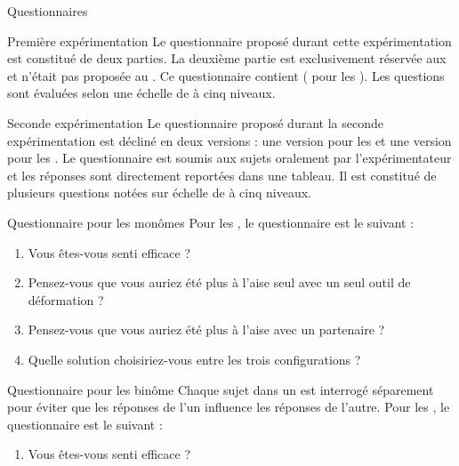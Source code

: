 \documentclass[myfrancais,ngerman,english,french]{mythesis}
\begin{document}
	\begin{mychapter}{Questionnaires}
		\begin{mysection}{Première expérimentation}
			Le questionnaire proposé durant cette expérimentation est constitué de deux parties.
			La deuxième partie est exclusivement réservée aux  et n'était pas proposée au .
			Ce questionnaire contient  ( pour les ).
			Les questions sont évaluées selon une échelle de  à cinq niveaux.
		\end{mysection}
		\begin{mysection}{Seconde expérimentation}
			Le questionnaire proposé durant la seconde expérimentation est décliné en deux versions : une version pour les  et une version pour les .
			Le questionnaire est soumis aux sujets oralement par l'expérimentateur et les réponses sont directement reportées dans une tableau.
			Il est constitué de plusieurs questions notées sur échelle de  à cinq niveaux.
			\begin{mysubsection}{Questionnaire pour les monômes}
				Pour les , le questionnaire est le suivant :
				\begin{enumerate}
					\item Vous êtes-vous senti efficace ?
					\item Pensez-vous que vous auriez été plus à l'aise seul avec un seul outil de déformation ?
					\item Pensez-vous que vous auriez été plus à l'aise avec un partenaire ?
					\item Quelle solution choisiriez-vous entre les trois configurations ?
				\end{enumerate}
			\end{mysubsection}
			\begin{mysubsection}{Questionnaire pour les binôme}
				Chaque sujet dans un  est interrogé séparement pour éviter que les réponses de l'un influence les réponses de l'autre.
				Pour les , le questionnaire est le suivant :
				\begin{enumerate}
					\item Vous êtes-vous senti efficace ?

\end{enumerate}
\end{mysubsection}
\end{mysection}
\end{mychapter}
\end{document}

